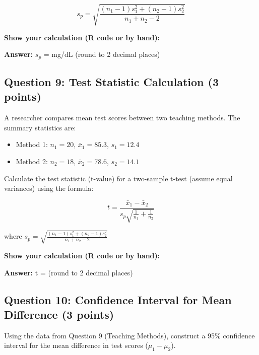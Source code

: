 \documentclass[11pt]{article}
\begin{document}
$$s_p = \sqrt{\frac{(n_1-1)s_1^2 + (n_2-1)s_2^2}{n_1 + n_2 - 2}}$$

\vspace{0.3cm}

\textbf{Show your calculation (R code or by hand):}

\vspace{3cm}

\textbf{Answer:} $s_p$ = \underline{\hspace{3cm}} mg/dL (round to 2 decimal places)

\vspace{1cm}

\subsection*{Question 9: Test Statistic Calculation (3 points)}

A researcher compares mean test scores between two teaching methods. The summary statistics are:

\begin{itemize}
\item Method 1: $n_1 = 20$, $\bar{x}_1 = 85.3$, $s_1 = 12.4$
\item Method 2: $n_2 = 18$, $\bar{x}_2 = 78.6$, $s_2 = 14.1$
\end{itemize}

Calculate the test statistic (t-value) for a two-sample t-test (assume equal variances) using the formula:

$$t = \frac{\bar{x}_1 - \bar{x}_2}{s_p \sqrt{\frac{1}{n_1} + \frac{1}{n_2}}}$$

where $s_p = \sqrt{\frac{(n_1-1)s_1^2 + (n_2-1)s_2^2}{n_1 + n_2 - 2}}$

\vspace{0.3cm}

\textbf{Show your calculation (R code or by hand):}

\vspace{4cm}

\textbf{Answer:} t = \underline{\hspace{3cm}} (round to 2 decimal places)

\vspace{1cm}

\subsection*{Question 10: Confidence Interval for Mean Difference (3 points)}

Using the data from Question 9 (Teaching Methods), construct a 95\% confidence interval for the mean difference in test scores ($\mu_1 - \mu_2$).
\end{document}
